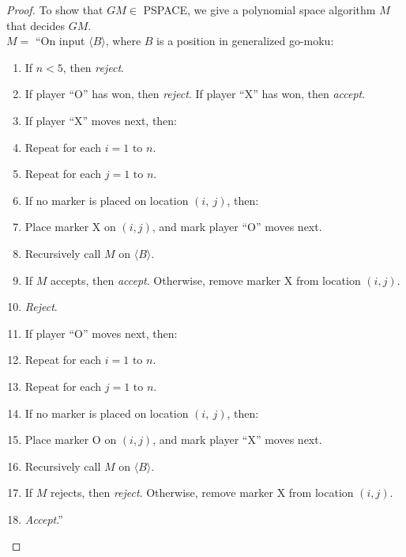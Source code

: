 \documentclass[11pt]{article}
\begin{document}
\begin{proof}
To show that $GM \in $ PSPACE, we give a polynomial space algorithm $M$ that decides $GM$. \\

$M =$ \textquotedblleft On input $\langle B \rangle$, where $B$ is a position in generalized go-moku:
\begin{enumerate}
\item If $n < 5$, then \textit{reject}.
\item If player ``O'' has won, then \textit{reject}.  If player ``X'' has won, then \textit{accept}.
\item If player ``X'' moves next, then:
\item \hspace*{0.5cm} Repeat for each $i = 1 \text{ to } n$.
\item \hspace*{1.0cm} Repeat for each $j = 1 \text{ to } n$.
\item \hspace*{1.5cm} If no marker is placed on location $(i, \ j)$, then:
\item \hspace*{2.0cm} Place marker X on $(i, j)$, and mark player ``O'' moves next.
\item \hspace*{2.0cm} Recursively call $M$ on $\langle B \rangle$.
\item \hspace*{2.0cm} If $M$ accepts, then \textit{accept}. Otherwise, remove marker X from location $(i, j)$.
\item \hspace*{0.5cm} \textit{Reject}.
\item If player ``O'' moves next, then:
\item \hspace*{0.5cm} Repeat for each $i = 1 \text{ to } n$.
\item \hspace*{1.0cm} Repeat for each $j = 1 \text{ to } n$.
\item \hspace*{1.5cm} If no marker is placed on location $(i, \ j)$, then:
\item \hspace*{2.0cm} Place marker O on $(i, j)$, and mark player ``X'' moves next.
\item \hspace*{2.0cm} Recursively call $M$ on $\langle B \rangle$.
\item \hspace*{2.0cm} If $M$ rejects, then \textit{reject}. Otherwise, remove marker X from location $(i, j)$.
\item \hspace*{0.5cm} \textit{Accept}.\textquotedblright
\end{enumerate}
\end{proof}
\end{document}
